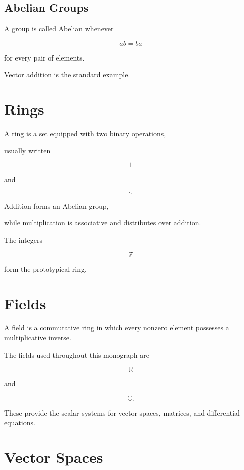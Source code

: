 \documentclass[11pt,fleqn]{book}
\numberwithin{equation}{chapter}
\theoremstyle{plain}
\theoremstyle{definition}
\theoremstyle{remark}
\begin{document}

\subsection{Abelian Groups}

A group is called Abelian whenever

\[
ab=ba
\]

for every pair of elements.

Vector addition is the standard example.


\section{Rings}

A ring is a set equipped with two binary operations,

usually written

\[
+
\]

and

\[
\cdot.
\]

Addition forms an Abelian group,

while multiplication is associative and distributes over addition.

The integers

\[
\mathbb Z
\]

form the prototypical ring.


\section{Fields}

A field is a commutative ring in which every nonzero element possesses a
multiplicative inverse.

The fields used throughout this monograph are

\[
\mathbb R
\]

and

\[
\mathbb C.
\]

These provide the scalar systems for vector spaces, matrices, and
differential equations.


\section{Vector Spaces}
\end{document}
